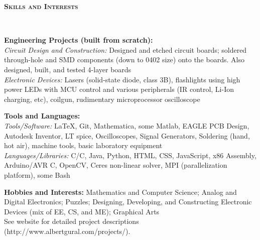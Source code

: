 \documentclass{article}
\newenvironment{changemargin}[2]{%
  \begin{list}{}{%
    \setlength{\topsep}{0pt}%
    \setlength{\leftmargin}{#1}%
    \setlength{\rightmargin}{#2}%
    \setlength{\listparindent}{\parindent}%
    \setlength{\itemindent}{\parindent}%
    \setlength{\parsep}{\parskip}%
  }%
  \item[]}{\end{list}
}
\newcommand{\lineover}{
	\begin{changemargin}{-0.05in}{-0.05in}
		\vspace*{-8pt}
		\hrulefill \\
		\vspace*{-2pt}
	\end{changemargin}
}
\newcommand{\header}[1]{
	\begin{changemargin}{-0.5in}{-0.5in}
		{\large \textbf{\scshape{#1}}}\\
  	\lineover
	\end{changemargin}
}
\newenvironment{body} {
	\vspace*{-16pt}
	\begin{changemargin}{-0.25in}{-0.5in}
  }	
	{\end{changemargin}
}
\newcommand{\CC}{C\nolinebreak\hspace{-.05em}\raisebox{.4ex}{\tiny\bf +}\nolinebreak\hspace{-.10em}\raisebox{.4ex}{\tiny\bf +}}
\begin{document}
\smallskip


\header{Skills and Interests}

\begin{body}
	\vspace{14pt}
	\textbf{Engineering Projects (built from scratch):} \\
	\textit{Circuit Design and Construction:} Designed and etched circuit boards; soldered through-hole and SMD components (down to 0402 size) onto the boards.  Also designed, built, and tested 4-layer boards \\
	\textit{Electronic Devices:} Lasers (solid-state diode, class 3B), flashlights using high power LEDs with MCU control and various peripherals (IR control, Li-Ion charging, etc), coilgun, rudimentary microprocessor oscilloscope \\
	
	\medskip

	\textbf{Tools and Languages:} \\
	\textit{Tools/Software:} \LaTeX, Git, Mathematica, some Matlab, EAGLE PCB Design, Autodesk Inventor, LT spice, Oscilloscopes, Signal Generators, Soldering (hand, hot air), machine tools, basic laboratory equipment \\
	\textit{Languages/Libraries:} C/\CC, Java, Python, HTML, CSS, JavaScript, x86 Assembly, Arduino/AVR C, OpenCV, Ceres non-linear solver, MPI (parallelization platform), some Bash \\

	\medskip

	\textbf{Hobbies and Interests:} Mathematics and Computer Science; Analog and Digital Electronics; Puzzles; Designing, Developing, and Constructing Electronic Devices (mix of EE, CS, and ME); Graphical Arts \\ See website for detailed project descriptions (http://www.albertgural.com/projects/). \\
\end{body}

\smallskip
\end{document}
